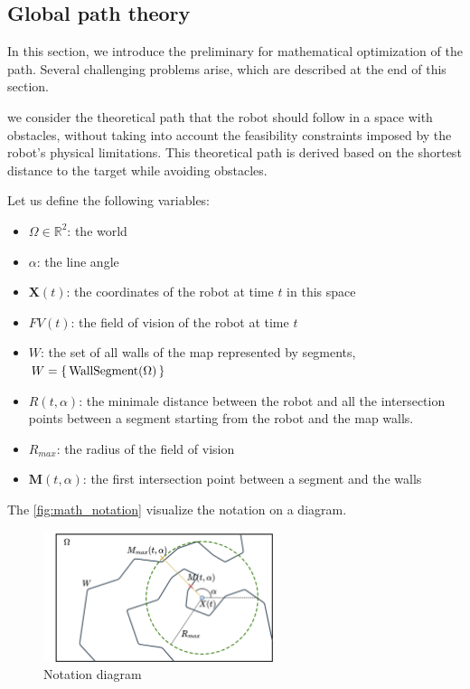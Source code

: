 \documentclass[../main.tex]{subfiles}
\begin{document}
\subsection{Global path theory}
In this section, we introduce the preliminary for mathematical optimization of the path. Several challenging problems arise, which are described at the end of this section.

we consider the theoretical path that the robot should follow in a space with obstacles, without taking into account the feasibility constraints imposed by the robot's physical limitations. This theoretical path is derived based on the shortest distance to the target while avoiding obstacles.

\vspace{1em}

Let us define the following variables:
\begin{itemize}
	\item $\Omega \in \mathbb{R}^{2}$: the world
	\item $\alpha$: the line angle 
	\item $\mathbf{X}(t)$: the coordinates of the robot at time $t$ in this space
	\item $FV(t)$: the field of vision of the robot at time $t$
	\item $W$: the set of all walls of the map represented by segments, $\displaystyle W = \left\{ \, \text{\rmfamily WallSegment} (\Omega)\, \right\}$
	\item $R(t, \alpha)$: the minimale distance between the robot and all the intersection points between a segment  starting from the robot and the map walls.
	\item $R_{max}$: the radius of the field of vision
	\item $\mathbf{M}(t, \alpha)$: the first intersection point between a segment and the walls
\end{itemize}


\vspace{0.5em}
The \autoref{fig:math_notation} visualize the notation on a diagram.
\begin{figure}[H]
	\centering
	\includegraphics[width=0.6\textwidth]{IMAGES/part3/math_nota.png}
	\caption{Notation diagram}
	\label{fig:math_notation}
\end{figure}
\end{document}
